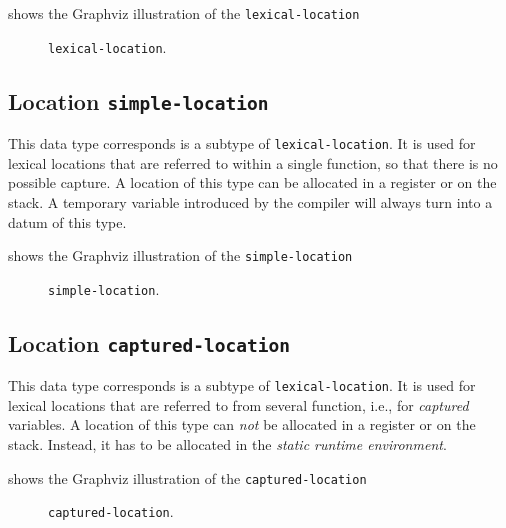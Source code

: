  shows the Graphviz illustration of the
\texttt{lexical-location}

\begin{figure}
\begin{center}
\end{center}
\caption{\label{fig-lexical-location}
\texttt{lexical-location}.}
\end{figure}

\subsection{Location \texttt{simple-location}}

This data type corresponds is a subtype of \texttt{lexical-location}.
It is used for lexical locations that are referred to within a single
function, so that there is no possible capture.  A location of this
type can be allocated in a register or on the stack.  A temporary
variable introduced by the compiler will always turn into a datum of
this type.

 shows the Graphviz illustration of the
\texttt{simple-location}

\begin{figure}
\begin{center}
\end{center}
\caption{\label{fig-simple-location}
\texttt{simple-location}.}
\end{figure}

\subsection{Location \texttt{captured-location}}

This data type corresponds is a subtype of \texttt{lexical-location}.
It is used for lexical locations that are referred to from several
function, i.e., for \emph{captured} variables.  A location of this
type can \emph{not} be allocated in a register or on the stack.
Instead, it has to be allocated in the \emph{static runtime
  environment}. 

 shows the Graphviz illustration of the
\texttt{captured-location}

\begin{figure}
\begin{center}
\end{center}
\caption{\label{fig-captured-location}
\texttt{captured-location}.}
\end{figure}


